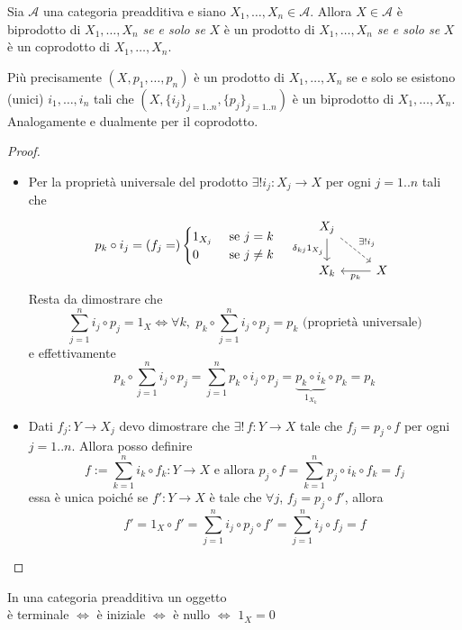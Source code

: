 \begin{proposition}{}
    Sia \(\mathcal{A}\) una categoria preadditiva e siano \(X_{1}, \dots, X_{n} \in \mathcal{A}\).
    Allora \(X \in \mathcal{A}\) è biprodotto di \(X_{1}, \dots, X_{n}\) \emph{se e solo se} \(X\) è un prodotto di \(X_{1}, \dots, X_{n}\) \emph{se e solo se }\(X\) è
    un coprodotto di \(X_{1}, \dots, X_{n}\).

    Più precisamente \((X, p_{1}, \dots, p_{n})\) è un prodotto di \(X_{1}, \dots, X_{n}\) se e solo se esistono (unici) \(i_{1},\dots, i_n\) tali che \({(X, \{i_j\}_{j=1. .n}, \{p_{j}\}_{j = 1. .n}  )}\) è un biprodotto di \(X_{1}, \dots, X_{n}\).
    Analogamente e dualmente per il coprodotto.
\end{proposition}
\begin{proof}\( \)
\begin{itemize}
    \item[\(\implies \)] Per la proprietà universale del prodotto \(\exists ! i_j : X_j \to X\) per ogni \(j=1 . .n\) tali che
        \[
          p_k \circ i_j = (f_{j} = ) \begin{cases}{}
              1_{X_j} & \text{ se } j = k \\
              0 & \text{ se } j\neq k
          \end{cases}\quad
\begin{tikzcd}
	X_j  \\
	{X_k} & X
	\arrow["{\delta_{kj} 1_{X_{j}} }"', from=1-1, to=2-1]
	\arrow["{\exists ! i_{j}}", dashed, from=1-1, to=2-2]
	\arrow["{p_k}", from=2-2, to=2-1]
\end{tikzcd}\]
        Resta da dimostrare che 
        \[
          \sum_{j=1}^{n} i_{j} \circ p_j = 1_X \iff \forall k, \,\, p_k \circ
          \sum_{j=1}^{n} i_{j} \circ p_{j} = p_k \text{ (proprietà universale)}
        \]
        e effettivamente 
        \[
          p_k \circ \sum_{j=1}^{n} i_{j} \circ p_{j} = \sum_{j=1}^{n} p_k \circ
          i_{j} \circ p_{j} = \underbrace{p_k \circ i_k}_{1_{X_k} }  \circ p_k = p_k
        \]
    \item[\(\impliedby \)] Dati \(f_{j} : Y \to X_j \) devo dimostrare che \(\exists  ! \, f : Y \to X\) tale che \(f_j = p_j \circ f\) per ogni \(j = 1..n\). Allora posso definire
        \[
          f := \sum_{k=1}^{n} i_k \circ f_k : Y \to  X \text{ e allora } p_j
          \circ f = \sum_{k=1}^{n} p_j \circ i_k \circ f_k = f_j 
        \]
        essa è unica poiché se \(f' : Y\to X\) è tale che \(\forall j\), \(f_j = p_j \circ f'\),
        allora \[f' = 1_X \circ f' = \sum_{j=1}^{n} i_j \circ p_j \circ f' = \sum_{j=1}^{n} i_j \circ f_j = f\] 
\end{itemize}
\end{proof}
\begin{remark}[\(n =0\)]
    In una categoria preadditiva un oggetto \\ è terminale \(\iff\)  è iniziale \(\iff\) è nullo \(\iff\) \(1_X = 0\) 
\end{remark}

